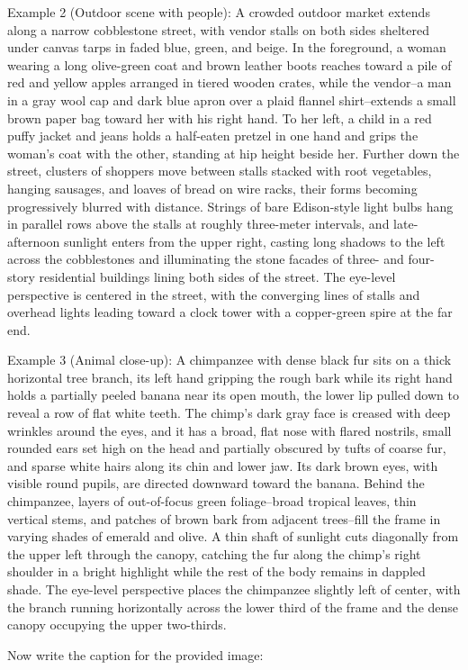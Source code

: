\begin{tcblisting}
Example 2 (Outdoor scene with people):
A crowded outdoor market extends along a narrow cobblestone street, with vendor stalls on both sides sheltered under canvas tarps in faded blue, green, and beige. In the foreground, a woman wearing a long olive-green coat and brown leather boots reaches toward a pile of red and yellow apples arranged in tiered wooden crates, while the vendor--a man in a gray wool cap and dark blue apron over a plaid flannel shirt--extends a small brown paper bag toward her with his right hand. To her left, a child in a red puffy jacket and jeans holds a half-eaten pretzel in one hand and grips the woman's coat with the other, standing at hip height beside her. Further down the street, clusters of shoppers move between stalls stacked with root vegetables, hanging sausages, and loaves of bread on wire racks, their forms becoming progressively blurred with distance. Strings of bare Edison-style light bulbs hang in parallel rows above the stalls at roughly three-meter intervals, and late-afternoon sunlight enters from the upper right, casting long shadows to the left across the cobblestones and illuminating the stone facades of three- and four-story residential buildings lining both sides of the street. The eye-level perspective is centered in the street, with the converging lines of stalls and overhead lights leading toward a clock tower with a copper-green spire at the far end.

Example 3 (Animal close-up):
A chimpanzee with dense black fur sits on a thick horizontal tree branch, its left hand gripping the rough bark while its right hand holds a partially peeled banana near its open mouth, the lower lip pulled down to reveal a row of flat white teeth. The chimp's dark gray face is creased with deep wrinkles around the eyes, and it has a broad, flat nose with flared nostrils, small rounded ears set high on the head and partially obscured by tufts of coarse fur, and sparse white hairs along its chin and lower jaw. Its dark brown eyes, with visible round pupils, are directed downward toward the banana. Behind the chimpanzee, layers of out-of-focus green foliage--broad tropical leaves, thin vertical stems, and patches of brown bark from adjacent trees--fill the frame in varying shades of emerald and olive. A thin shaft of sunlight cuts diagonally from the upper left through the canopy, catching the fur along the chimp's right shoulder in a bright highlight while the rest of the body remains in dappled shade. The eye-level perspective places the chimpanzee slightly left of center, with the branch running horizontally across the lower third of the frame and the dense canopy occupying the upper two-thirds.

Now write the caption for the provided image:
\end{tcblisting}



